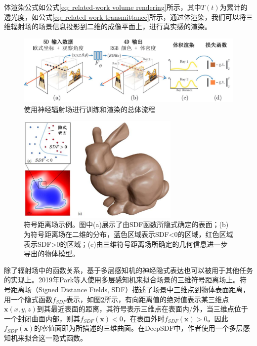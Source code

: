体渲染公式如公式\ref{eq: related-work volume rendering}所示，其中$T(t)$为累计的透光度，如公式\ref{eq: related-work transmittance}所示，通过体渲染，我们可以将三维辐射场的场景信息投影到二维的成像平面上，进行真实感的渲染。


\begin{figure}[t]
    \centering
    \includegraphics[width=\textwidth]{undergraduate-thesis/images/related-work/NeRF method.pdf}
    \caption{使用神经辐射场\cite{mildenhall_nerf_2020}进行训练和渲染的总体流程}
    \label{fig:related-work NeRF pipeline}
\end{figure}

\begin{figure}[ht]
    \centering
    \includegraphics[width=0.7\textwidth]{undergraduate-thesis/images/related-work/SDF concept.pdf}
    \caption{符号距离场示例。图中(a)展示了由SDF函数所隐式确定的表面；(b)为符号距离场在二维的分布，蓝色区域表示SDF<0的区域，红色区域表示SDF>0的区域；(c)由三维符号距离场所确定的几何信息进一步导出的物体模型。}
    \label{fig:related-work SDF concept}
\end{figure}

除了辐射场中的函数关系，基于多层感知机的神经隐式表达也可以被用于其他任务的实现上\cite{park_deepsdf_2019, mescheder_occupancy_2019, shim_snerl_2023, zhi_-place_2021}。2019年Park等人使用多层感知机来拟合场景的三维符号距离场上。符号距离场（Signed Distance Fields, SDF）描述了场景中三维点到物体表面距离，用一个隐式函数$f_{SDF}$表示，如图\ref{fig:related-work SDF concept}所示，有向距离值的绝对值表示某三维点$\mathbf{x}(x,y,z)$到其最近表面的距离，其符号表示三维点在表面内/外，当三维点位于一个封闭曲面内部，则其$f_{SDF}(\mathbf{x}) < 0$，在表面外时$f_{SDF}(\mathbf{x}) > 0$。因此$f_{SDF}(\mathbf{x})$的零值面即为所描述的三维曲面。在DeepSDF中，作者使用一个多层感知机来拟合这一隐式函数。

